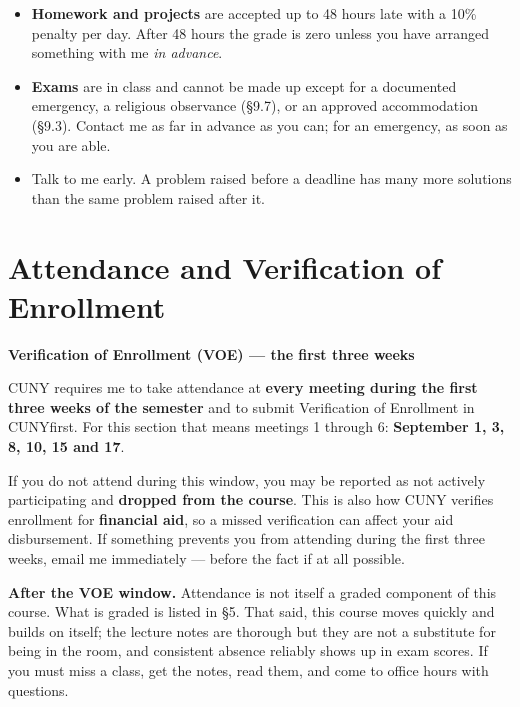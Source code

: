 \documentclass[11pt]{article}
\newenvironment{alertbox}[1]
  {\par\medskip\needspace{5\baselineskip}%
   \begin{lrbox}{\qcbox}%
   \begin{minipage}{\dimexpr\textwidth-2\fboxsep-4pt}%
   \setlength{\parskip}{0.4em}%
   \textbf{\color{warnrule}#1}\par}
  {\end{minipage}\end{lrbox}%
   \begin{center}\colorbox{warnbg}{\usebox{\qcbox}}\end{center}\medskip}
\begin{document}
\begin{itemize}
  \item \textbf{Homework and projects} are accepted up to 48 hours late with a
        10\% penalty per day. After 48 hours the grade is zero unless you have
        arranged something with me \emph{in advance}.
  \item \textbf{Exams} are in class and cannot be made up except for a
        documented emergency, a religious observance (\S9.7), or an approved
        accommodation (\S9.3). Contact me as far in advance as you can; for an
        emergency, as soon as you are able.
  \item Talk to me early. A problem raised before a deadline has many more
        solutions than the same problem raised after it.
\end{itemize}

\section{Attendance and Verification of Enrollment}

\begin{alertbox}{Verification of Enrollment (VOE) --- the first three weeks}
CUNY requires me to take attendance at \textbf{every meeting during the first
three weeks of the semester} and to submit Verification of Enrollment in
CUNYfirst. For this section that means meetings 1 through 6:
\textbf{September 1, 3, 8, 10, 15 and 17}.

If you do not attend during this window, you may be reported as not actively
participating and \textbf{dropped from the course}. This is also how CUNY
verifies enrollment for \textbf{financial aid}, so a missed verification can
affect your aid disbursement. If something prevents you from attending during
the first three weeks, email me immediately --- before the fact if at all
possible.
\end{alertbox}

\textbf{After the VOE window.} Attendance is not itself a graded component of
this course. What is graded is listed in \S5. That said, this course moves
quickly and builds on itself; the lecture notes are thorough but they are not a
substitute for being in the room, and consistent absence reliably shows up in
exam scores. If you must miss a class, get the notes, read them, and come to
office hours with questions.
\end{document}
